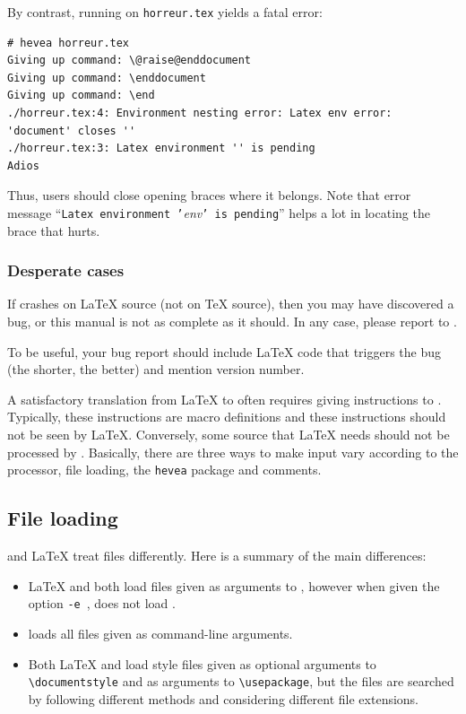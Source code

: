 By contrast, running \hevea{} on \texttt{horreur.tex} yields a fatal error:
\begin{verbatim}
# hevea horreur.tex 
Giving up command: \@raise@enddocument
Giving up command: \enddocument
Giving up command: \end
./horreur.tex:4: Environment nesting error: Latex env error: 'document' closes ''
./horreur.tex:3: Latex environment '' is pending
Adios
\end{verbatim}
Thus, users should close opening braces where it belongs.
Note that \hevea{} error message ``\texttt{Latex environment
'}\textit{env}\texttt{' is pending}'' helps a lot in locating
the brace that hurts.

\subsubsection{Desperate cases}

If \hevea{} crashes on \LaTeX{} source (not on \TeX{} source),
then you may have discovered a bug, or this manual is not as complete
as it should.
In any case, please report to .

To be useful, your bug report should include \LaTeX{} code
that triggers the bug (the shorter, the better) and mention
\hevea{} version number.




\label{both}
A satisfactory translation from \LaTeX{} to \html{} often requires
giving instructions to \hevea{}.
Typically, these instructions are macro definitions and
these instructions should not be seen by \LaTeX{}.
Conversely, some source that \LaTeX{} needs should not be processed
by \hevea{}.
Basically, there are three ways to make input vary according to the
processor, file loading, the \texttt{hevea} package
and comments.


\subsection{File loading}\label{fileloading}

\hevea{} and \LaTeX{} treat files differently. Here is a summary of the main
differences:

\begin{itemize}
  \item \LaTeX{} and \hevea{} both load files given as arguments to
  \verb++, however when given the option \verb+-e+~,
  \hevea{} does not load .
  \item \hevea{} loads all files given as command-line arguments.
  \item Both \LaTeX{} and \hevea{} load style files given as optional
  arguments to 
  \verb+\documentstyle+ and as arguments to \verb+\usepackage+,
  but the files are searched by following different methods and
  considering different file extensions.  
\end{itemize}


